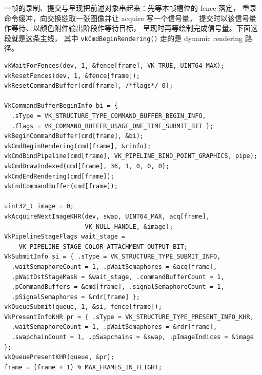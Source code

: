 \documentclass[12pt,a4paper,fontset=fandol]{ctexbook}
\newcommand{\Fn}[1]{\texttt{#1()}}
\newcommand{\Bk}{\discretionary{}{}{}}
\begin{document}
一帧的录制、提交与呈现把前述对象串起来：先等本帧槽位的 fence 落定，
重录命令缓冲，向交换链取一张图像并让 acquire 写一个信号量，
提交时以该信号量作等待、以颜色附件输出阶段作等待目标，
呈现时再等绘制完成信号量。下面这段就是这条主线，
其中 \Fn{vkCmd\Bk Begin\Bk Rendering} 走的是 dynamic rendering 路径。

\begin{lstlisting}[style=cstyle,caption={一帧：等 fence、录制、提交、呈现},label={lst:ch09-frame}]
vkWaitForFences(dev, 1, &fence[frame], VK_TRUE, UINT64_MAX);
vkResetFences(dev, 1, &fence[frame]);
vkResetCommandBuffer(cmd[frame], /*flags*/ 0);

VkCommandBufferBeginInfo bi = {
  .sType = VK_STRUCTURE_TYPE_COMMAND_BUFFER_BEGIN_INFO,
  .flags = VK_COMMAND_BUFFER_USAGE_ONE_TIME_SUBMIT_BIT };
vkBeginCommandBuffer(cmd[frame], &bi);
vkCmdBeginRendering(cmd[frame], &rinfo);
vkCmdBindPipeline(cmd[frame], VK_PIPELINE_BIND_POINT_GRAPHICS, pipe);
vkCmdDrawIndexed(cmd[frame], 36, 1, 0, 0, 0);
vkCmdEndRendering(cmd[frame]);
vkEndCommandBuffer(cmd[frame]);

uint32_t image = 0;
vkAcquireNextImageKHR(dev, swap, UINT64_MAX, acq[frame],
                      VK_NULL_HANDLE, &image);
VkPipelineStageFlags wait_stage =
    VK_PIPELINE_STAGE_COLOR_ATTACHMENT_OUTPUT_BIT;
VkSubmitInfo si = { .sType = VK_STRUCTURE_TYPE_SUBMIT_INFO,
  .waitSemaphoreCount = 1, .pWaitSemaphores = &acq[frame],
  .pWaitDstStageMask = &wait_stage, .commandBufferCount = 1,
  .pCommandBuffers = &cmd[frame], .signalSemaphoreCount = 1,
  .pSignalSemaphores = &rdr[frame] };
vkQueueSubmit(queue, 1, &si, fence[frame]);
VkPresentInfoKHR pr = { .sType = VK_STRUCTURE_TYPE_PRESENT_INFO_KHR,
  .waitSemaphoreCount = 1, .pWaitSemaphores = &rdr[frame],
  .swapchainCount = 1, .pSwapchains = &swap, .pImageIndices = &image };
vkQueuePresentKHR(queue, &pr);
frame = (frame + 1) % MAX_FRAMES_IN_FLIGHT;
\end{lstlisting}
\end{document}
